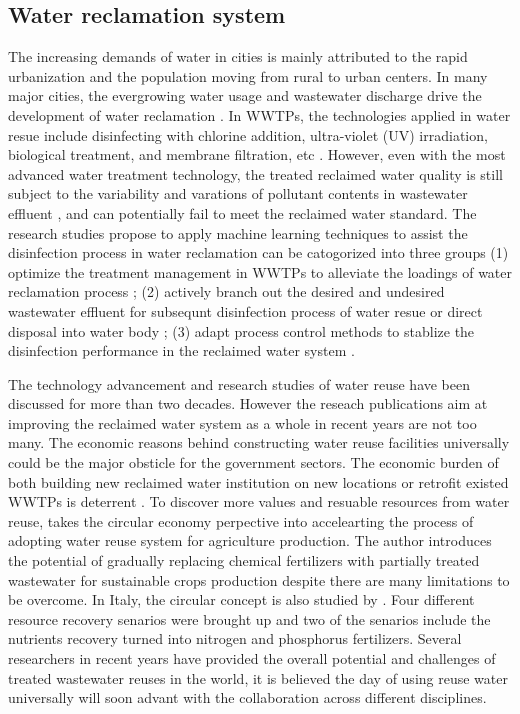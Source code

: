 \subsection{Water reclamation system}
The increasing demands of water in cities is mainly attributed to the rapid urbanization and the population moving from rural to urban centers. In many major cities, the evergrowing water usage and wastewater discharge drive the development of water reclamation \citep{lyuWastewaterReclamationReuse2016}. In WWTPs, the technologies applied in water resue include disinfecting with chlorine addition, ultra-violet (UV) irradiation, biological treatment, and membrane filtration, etc \citep{norton-brandaoReclamationUsedUrban2013}. However, even with the most advanced water treatment technology, the treated reclaimed water quality is still subject to the variability and varations of pollutant contents in wastewater effluent \citep{chenAssessingWastewaterReclamation2003}, and can potentially fail to meet the reclaimed water standard. The research studies propose to apply machine learning techniques to assist the disinfection process in water reclamation can be catogorized into three groups (1) optimize the treatment management in WWTPs to alleviate the loadings of water reclamation process \citep{al-ghazawiUseArtificialNeural2021,vietEnhancementMembraneSystem2021}; (2) actively branch out the desired and undesired wastewater effluent for subsequnt disinfection process of water resue or direct disposal into water body \citep{chenAssessingWastewaterReclamation2003}; (3) adapt process control methods to stablize the disinfection performance in the reclaimed water system \citep{demirFeedbackControlChlorine2014a}. 

The technology advancement and research studies of water reuse have been discussed for more than two decades. However the reseach publications aim at improving the reclaimed water system as a whole in recent years are not too many. The economic reasons behind constructing water reuse facilities universally could be the major obsticle for the government sectors. The economic burden of both building new reclaimed water institution on new locations or retrofit existed WWTPs is deterrent \citep{adewumiTreatedWastewaterReuse2010}. To discover more values and resuable resources from water reuse, \citet{chojnackaTransitionConventionalIrrigation2020} takes the circular economy perpective into accelearting the process of adopting water reuse system for agriculture production. The author introduces the potential of gradually replacing chemical fertilizers with partially treated wastewater for sustainable crops production despite there are many limitations to be overcome. In Italy, the circular concept is also studied by \citet{colellaChallengesOpportunitiesMore2021}. Four different resource recovery senarios were brought up and two of the senarios include the nutrients recovery turned into nitrogen and phosphorus fertilizers. Several researchers in recent years have provided the overall potential and challenges of treated wastewater reuses in the world, it is believed the day of using reuse water universally will soon advant with the collaboration across different disciplines. 

